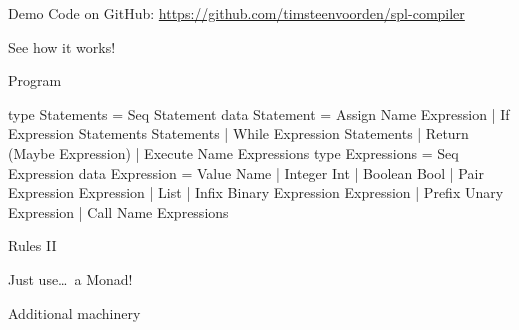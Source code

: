 \begin{frame}{Demo}
  Code on GitHub: \url{https://github.com/timsteenvoorden/spl-compiler}

  \bigskip

  See how it works!
\end{frame}

\appendix

\begin{frame}[fragile]{Program}
  \begin{block}{}
    \begin{HASKELL}
      type Statements  = Seq Statement
      data Statement   = Assign  Name Expression
                       | If      Expression Statements Statements
                       | While   Expression Statements
                       | Return  (Maybe Expression)
                       | Execute Name Expressions
      type Expressions = Seq Expression
      data Expression  = Value    Name
                       | Integer  Int
                       | Boolean  Bool
                       | Pair     Expression Expression
                       | List
                       | Infix    Binary Expression Expression
                       | Prefix   Unary  Expression
                       | Call     Name   Expressions
    \end{HASKELL}
  \end{block}
\end{frame}


\begin{frame}[fragile]{Rules II}


  Just use\ldots\ a Monad!


  Additional machinery

  \begin{block}{}
  \end{block}

\end{frame}





